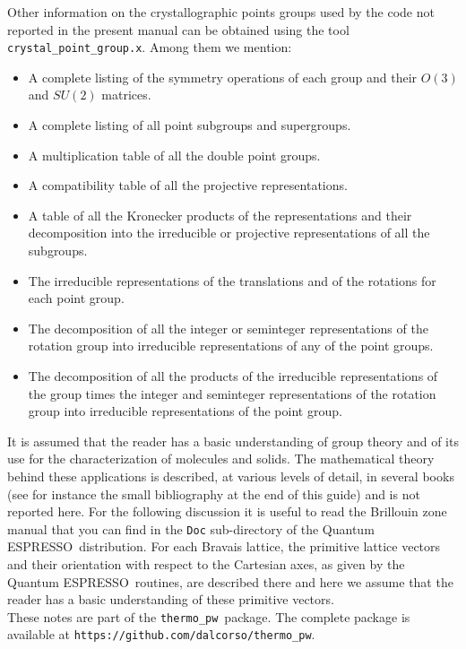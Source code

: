 \documentclass[12pt,a4paper]{article}
\def\qe{{\sc Quantum ESPRESSO}}
\def\thermo{\texttt{thermo\_pw}}
\begin{document}
Other information on the crystallographic points groups used by the code 
not reported in the present manual can be obtained using the tool 
\texttt{crystal\_point\_group.x}. Among them we mention:
\begin{itemize}

\item A complete listing of the symmetry operations of each group
and their $O(3)$ and $SU(2)$ matrices.

\item A complete listing of all point subgroups and supergroups.

\item A multiplication table of all the double point groups.

\item A compatibility table of all the projective representations.

\item A table of all the Kronecker products of the representations and
their decomposition into the irreducible or projective representations
of all the subgroups.

\item The irreducible representations of the translations and of the rotations
for each point group.

\item The decomposition of all the integer or seminteger representations
of the rotation group into irreducible representations of any of the point groups.

\item The decomposition of all the products of the irreducible representations 
of the group times the integer and seminteger representations of the 
rotation group into irreducible representations of the point group.

\end{itemize}
It is assumed that the reader has a basic understanding of group theory and
of its use for the characterization of molecules and solids.
The mathematical theory behind these applications is described, 
at various levels of detail, in several books (see for instance the small 
bibliography at the end of this guide) and is not reported here. 
For the following discussion it is useful to read the Brillouin zone 
manual that you can find in the \texttt{Doc} sub-directory of the 
\qe\ distribution. For each Bravais lattice, the primitive lattice vectors
and their orientation with respect to the Cartesian axes, as given by the
\qe\ routines, are described there and here we assume that the reader has a
basic understanding of these primitive vectors. \\
These notes are part of the \thermo\ package. The complete package is
available at \texttt{https://github.com/dalcorso/thermo\_pw}.
\end{document}

